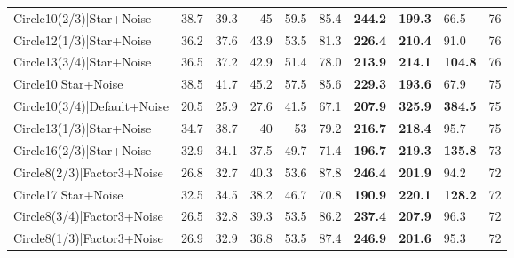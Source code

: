 \begin{tabular}{lrrrrllllr}
 Circle10(2/3)|Star+Noise                             &         38.7 &         39.3 &         45   &            59.5 & 85.4           & \textbf{244.2} & \textbf{199.3} & 66.5           &           76 \\
 Circle12(1/3)|Star+Noise                             &         36.2 &         37.6 &         43.9 &            53.5 & 81.3           & \textbf{226.4} & \textbf{210.4} & 91.0           &           76 \\
 Circle13(3/4)|Star+Noise                             &         36.5 &         37.2 &         42.9 &            51.4 & 78.0           & \textbf{213.9} & \textbf{214.1} & \textbf{104.8} &           76 \\
 Circle10|Star+Noise                                  &         38.5 &         41.7 &         45.2 &            57.5 & 85.6           & \textbf{229.3} & \textbf{193.6} & 67.9           &           75 \\
 Circle10(3/4)|Default+Noise                          &         20.5 &         25.9 &         27.6 &            41.5 & 67.1           & \textbf{207.9} & \textbf{325.9} & \textbf{384.5} &           75 \\
 Circle13(1/3)|Star+Noise                             &         34.7 &         38.7 &         40   &            53   & 79.2           & \textbf{216.7} & \textbf{218.4} & 95.7           &           75 \\
 Circle16(2/3)|Star+Noise                             &         32.9 &         34.1 &         37.5 &            49.7 & 71.4           & \textbf{196.7} & \textbf{219.3} & \textbf{135.8} &           73 \\
 Circle8(2/3)|Factor3+Noise                           &         26.8 &         32.7 &         40.3 &            53.6 & 87.8           & \textbf{246.4} & \textbf{201.9} & 94.2           &           72 \\
 Circle17|Star+Noise                                  &         32.5 &         34.5 &         38.2 &            46.7 & 70.8           & \textbf{190.9} & \textbf{220.1} & \textbf{128.2} &           72 \\
 Circle8(3/4)|Factor3+Noise                           &         26.5 &         32.8 &         39.3 &            53.5 & 86.2           & \textbf{237.4} & \textbf{207.9} & 96.3           &           72 \\
 Circle8(1/3)|Factor3+Noise                           &         26.9 &         32.9 &         36.8 &            53.5 & 87.4           & \textbf{246.9} & \textbf{201.6} & 95.3           &           72 \\

\end{tabular}
